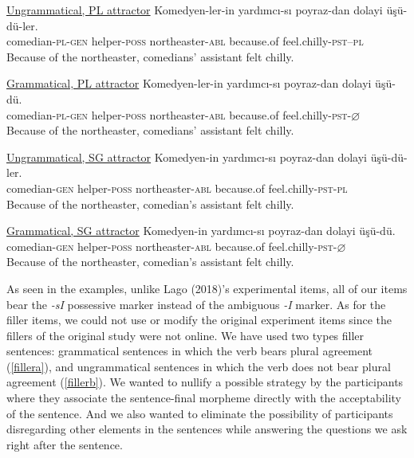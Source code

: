 \documentclass[doc]{apa6}
\begin{document}
\begin{exe}
\ex
  \begin{xlist}
  \ex \underline{Ungrammatical, PL attractor} \label{exp3}
      \gll Komedyen-ler-in yard{\i}mc{\i}-s{\i} poyraz-dan dolayi \"{u}\c{s}\"{u}-d\"{u}-ler.\\
  comedian-\textsc{pl}-\textsc{gen} helper-\textsc{poss} northeaster-\textsc{abl} because.of feel.chilly-\textsc{pst}--\textsc{pl}\\
      \glt Because of the northeaster, comedians' assistant felt chilly.

  \ex \underline{Grammatical, PL attractor} \label{exp2}
      \gll Komedyen-ler-in yard{\i}mc{\i}-s{\i} poyraz-dan dolayi \"{u}\c{s}\"{u}-d\"{u}.\\
  comedian-\textsc{pl}-\textsc{gen} helper-\textsc{poss} northeaster-\textsc{abl} because.of feel.chilly-\textsc{pst}-$\varnothing$\\
      \glt Because of the northeaster, comedians' assistant felt chilly.

  
  \ex \underline{Ungrammatical, SG attractor} \label{exp4}
      \gll Komedyen-in yard{\i}mc{\i}-s{\i} poyraz-dan dolayi \"{u}\c{s}\"{u}-d\"{u}-ler.\\
  comedian-\textsc{gen} helper-\textsc{poss} northeaster-\textsc{abl} because.of feel.chilly-\textsc{pst}-\textsc{pl}\\
      \glt Because of the northeaster, comedian's assistant felt chilly.
  
  \ex \underline{Grammatical, SG attractor} \label{exp1}
      \gll Komedyen-in yard{\i}mc{\i}-s{\i} poyraz-dan dolayi \"{u}\c{s}\"{u}-d\"{u}.\\
  comedian-\textsc{gen} helper-\textsc{poss} northeaster-\textsc{abl} because.of feel.chilly-\textsc{pst}-$\varnothing$\\
      \glt Because of the northeaster, comedian's assistant felt chilly.

  \end{xlist}
\end{exe}

As seen in the examples, unlike Lago (2018)'s experimental items, all of
our items bear the \emph{-sI} possessive marker instead of the ambiguous
\emph{-I} marker. As for the filler items, we could not use or modify
the original experiment items since the fillers of the original study
were not online. We have used two types filler sentences: grammatical
sentences in which the verb bears plural agreement (\ref{fillera}), and
ungrammatical sentences in which the verb does not bear plural agreement
(\ref{fillerb}). We wanted to nullify a possible strategy by the
participants where they associate the sentence-final morpheme directly
with the acceptability of the sentence. And we also wanted to eliminate
the possibility of participants disregarding other elements in the
sentences while answering the questions we ask right after the sentence.
\end{document}
